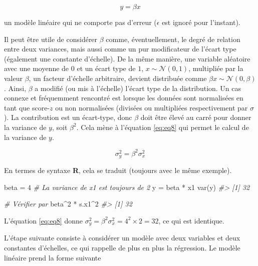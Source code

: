 \documentclass[
]{book}
\newenvironment{Shaded}{}{}
\newcommand{\CommentTok}[1]{\textit{#1}}
\newcommand{\DecValTok}[1]{#1}
\newcommand{\FunctionTok}[1]{#1}
\newcommand{\NormalTok}[1]{#1}
\newcommand{\OtherTok}[1]{#1}
\newcommand{\SpecialCharTok}[1]{#1}
\begin{document}
\begin{equation}
y=\beta x
\label{eq:eq7}
\end{equation}

un modèle linéaire qui ne comporte pas d'erreur (\(\epsilon\) est ignoré pour l'instant).

Il peut être utile de considérer \(\beta\) comme, éventuellement, le degré de relation entre deux variances, mais aussi comme un pur modificateur de l'écart type (également une constante d'échelle). De la même manière, une variable aléatoire avec une moyenne de \(0\) et un écart type de \(1\), \(x\sim \mathcal{N}(0,1)\), multipliée par la valeur \(\beta\), un facteur d'échelle arbitraire, devient distribuée comme \(\beta x \sim \mathcal{N}(0,\beta)\). Ainsi, \(\beta\) a modifié (ou mis à l'échelle) l'écart type de la distribution. Un cas connexe et fréquemment rencontré est lorsque les données sont normalisées en tant que score-\(z\) ou non normalisées (divisées ou multipliées respectivement par \(\sigma\)). La contribution est un écart-type, donc \(\beta\) doit être élevé au carré pour donner la variance de \(y\), soit \(\beta^2\). Cela mène à l'équation \eqref{eq:eq8} qui permet le calcul de la variance de \(y\).

\begin{equation}
\sigma_y^2=\beta^2 \sigma_x^2
\label{eq:eq8}
\end{equation}

En termes de syntaxe \textbf{R}, cela se traduit (toujours avec le même exemple).

\begin{Shaded}
\begin{Highlighting}[]
\NormalTok{beta }\OtherTok{=} \DecValTok{4}
\CommentTok{\# La variance de x1 est toujours de 2}
\NormalTok{y }\OtherTok{=}\NormalTok{ beta }\SpecialCharTok{*}\NormalTok{ x1}
\FunctionTok{var}\NormalTok{(y)}
\CommentTok{\#\textgreater{} [1] 32}

\CommentTok{\# Vérifier par}
\NormalTok{beta}\SpecialCharTok{\^{}}\DecValTok{2} \SpecialCharTok{*}\NormalTok{ s.x1}\SpecialCharTok{\^{}}\DecValTok{2}
\CommentTok{\#\textgreater{} [1] 32}
\end{Highlighting}
\end{Shaded}

L'équation \eqref{eq:eq8} donne \(\sigma_y^2=\beta^2 \sigma_x^2=4^2 \times 2= 32\), ce qui est identique.

L'étape suivante consiste à considérer un modèle avec deux variables et deux constantes d'échelles, ce qui rappelle de plus en plus la régression. Le modèle linéaire prend la forme suivante
\end{document}
